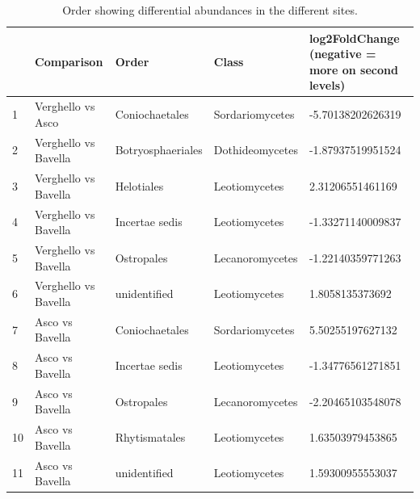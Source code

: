\documentclass[12pt]{article}\usepackage[]{graphicx}\usepackage[]{color}
\numberwithin{figure}{section}
\begin{document}
\begin{table}[ht]
\centering
\begingroup\tiny
\begin{tabular}{lllll}
  \hline
 & Comparison & Order & Class & log2FoldChange 
 (negative = more on second levels) \\ 
  \hline
1 & Verghello vs Asco & Coniochaetales & Sordariomycetes & -5.70138202626319 \\ 
  2 & Verghello vs Bavella & Botryosphaeriales & Dothideomycetes & -1.87937519951524 \\ 
  3 & Verghello vs Bavella & Helotiales & Leotiomycetes & 2.31206551461169 \\ 
  4 & Verghello vs Bavella & Incertae sedis & Leotiomycetes & -1.33271140009837 \\ 
  5 & Verghello vs Bavella & Ostropales & Lecanoromycetes & -1.22140359771263 \\ 
  6 & Verghello vs Bavella & unidentified & Leotiomycetes & 1.8058135373692 \\ 
  7 & Asco vs Bavella & Coniochaetales & Sordariomycetes & 5.50255197627132 \\ 
  8 & Asco vs Bavella & Incertae sedis & Leotiomycetes & -1.34776561271851 \\ 
  9 & Asco vs Bavella & Ostropales & Lecanoromycetes & -2.20465103548078 \\ 
  10 & Asco vs Bavella & Rhytismatales & Leotiomycetes & 1.63503979453865 \\ 
  11 & Asco vs Bavella & unidentified & Leotiomycetes & 1.59300955553037 \\ 
   \hline
\end{tabular}
\endgroup
\caption{Order showing differential abundances in the different sites.} 
\end{table}


\cleardoublepage
\listoffigures
\listoftables
\end{document}

